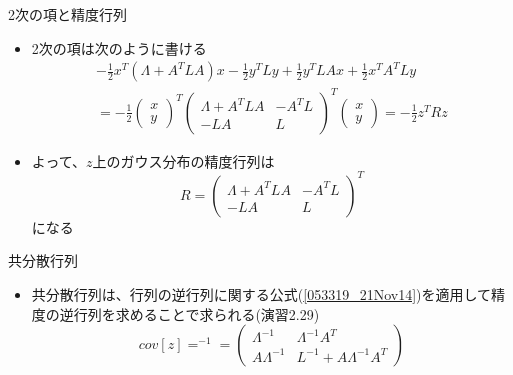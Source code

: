 \begin{frame}{2次の項と精度行列}
 \begin{itemize}
  \item 2次の項は次のように書ける
        \begin{eqnarray}
         -\frac{1}{2}x^T(\Lambda+A^TLA)x -\frac{1}{2}y^TLy+\frac{1}{2}y^TLAx+\frac{1}{2}x^TA^TLy \nonumber \\
         = -\frac{1}{2}
          \begin{pmatrix}
           x \\
           y
          \end{pmatrix}^T
          \begin{pmatrix}
           \Lambda+A^TLA & -A^TL\\
           -LA & L
          \end{pmatrix}^T
          \begin{pmatrix}
           x \\
           y
          \end{pmatrix}
          = -\frac{1}{2}z^TRz
        \end{eqnarray}
  \item よって、$z$上のガウス分布の精度行列は
        \begin{equation}
         R=
          \begin{pmatrix}
           \Lambda+A^TLA & -A^TL\\
           -LA & L
          \end{pmatrix}^T
        \end{equation}
        になる
 \end{itemize}
\end{frame}

\begin{frame}{共分散行列}
 \begin{itemize}
  \item 共分散行列は、行列の逆行列に関する公式(\ref{053319_21Nov14})を適用して精度の逆行列を求めることで求られる(演習2.29)
        \begin{equation}
         cov[z]=^{-1}=
          \begin{pmatrix}
           \Lambda^{-1} & \Lambda^{-1}A^T \\
           A\Lambda^{-1} & L^{-1} + A\Lambda^{-1}A^T
          \end{pmatrix}\label{054122_21Nov14}
        \end{equation}
 \end{itemize}
\end{frame}

